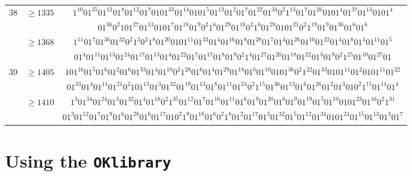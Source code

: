 \documentclass[final,3p,times]{elsarticle}
\theoremstyle{definition}
\newcommand{\OKlibrary}{\texttt{OKlibrary}}
\begin{document}
\begin{appendix}
{\begin{longtable}[c]{|c|c|c|}
\hline
$38$ & $\geq 1335$ & $1^{10}01^{35}01^{12}01^{8}01^{12}01^{7}0101^{33}01^{14}0101^{5}01^{13}01^{2}01^{7}01^{22}01^{34}0^{2}1^{13}01^{7}01^{26}0101^{4}01^{37}01^{13}0101^{4}$\\[-2ex]
&& $01^{36}0^{2}101^{27}01^{13}0101^{7}01^{18}01^{9}0^{2}1^{6}01^{29}01^{18}0^{2}1^{6}01^{28}0101^{21}0^{2}1^{19}01^{9}01^{36}01^{6}01^{6}$\\[-1ex]
& $\geq 1368$ & $1^{11}01^{7}01^{36}01^{32}0^{2}1^{3}0^{2}1^{8}01^{20}0101^{11}01^{33}01^{4}01^{16}01^{8}01^{28}01^{7}01^{4}01^{26}01^{10}01^{22}01^{4}01^{8}01^{4}01^{11}01^{5}$\\[-2ex]
&& $01^{4}01^{11}01^{13}01^{24}01^{17}01^{13}01^{4}01^{22}01^{7}01^{17}01^{8}01^{9}0^{2}1^{4}01^{27}01^{20}01^{18}01^{22}01^{3}01^{9}0^{2}1^{25}01^{10}01^{27}01$\\
\hline
$39$ & $\geq 1405$ & $101^{16}01^{5}01^{6}01^{2}01^{6}01^{33}01^{4}01^{10}0^{2}1^{28}01^{6}01^{4}01^{29}01^{18}01^{6}01^{10}0101^{36}0^{2}1^{22}01^{33}0101^{11}01^{2}0101^{11}01^{22}$\\[-2ex]
&& $01^{33}01^{4}01^{11}01^{21}0^{2}101^{13}01^{3}01^{32}01^{19}01^{13}01^{8}01^{11}01^{24}0^{2}1^{15}01^{36}01^{13}01^{6}01^{26}01^{2}01^{3}010^{2}1^{15}01^{11}01^{4}$\\[-1ex]
& $\geq 1410$ & $1^{3}01^{34}01^{24}01^{3}01^{32}01^{4}01^{18}0^{2}1^{35}01^{12}01^{7}01^{16}01^{11}01^{6}01^{9}01^{20}01^{6}01^{9}01^{19}01^{5}01^{10}0101^{23}01^{16}0^{2}1^{31}$\\[-2ex]
&& $01^{3}01^{12}01^{7}01^{9}01^{6}01^{28}01^{6}01^{17}010^{2}1^{9}01^{18}01^{6}0^{2}1^{8}01^{2}01^{17}01^{3}01^{32}01^{5}01^{12}01^{34}0101^{24}01^{15}01^{13}01^{3}01^{7}$\\
\hline
\hline
\end{longtable}
}




\section{Using the \OKlibrary}
\label{sec:OKl}


\end{appendix}
\end{document}
